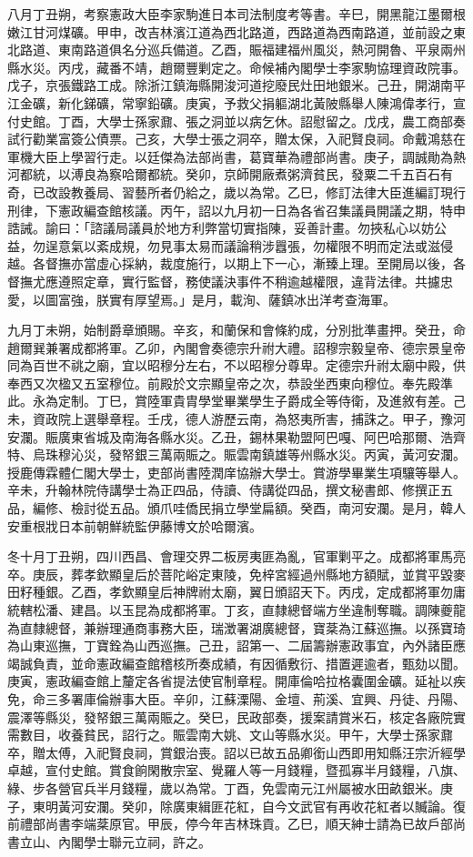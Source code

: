 \begin{pinyinscope}
八月丁丑朔，考察憲政大臣李家駒進日本司法制度考等書。辛巳，開黑龍江墨爾根嫩江甘河煤礦。甲申，改吉林濱江道為西北路道，西路道為西南路道，並前設之東北路道、東南路道俱名分巡兵備道。乙酉，賑福建福州風災，熱河開魯、平泉兩州縣水災。丙戌，藏番不靖，趙爾豐剿定之。命候補內閣學士李家駒協理資政院事。戊子，京張鐵路工成。除浙江鎮海縣開浚河道挖廢民灶田地銀米。己丑，開湖南平江金礦，新化銻礦，常寧鉛礦。庚寅，予救父捐軀湖北黃陂縣舉人陳鴻偉孝行，宣付史館。丁酉，大學士孫家鼐、張之洞並以病乞休。詔慰留之。戊戌，農工商部奏試行勸業富簽公債票。己亥，大學士張之洞卒，贈太保，入祀賢良祠。命戴鴻慈在軍機大臣上學習行走。以廷傑為法部尚書，葛寶華為禮部尚書。庚子，調誠勛為熱河都統，以溥良為察哈爾都統。癸卯，京師開廠煮粥濟貧民，發粟二千五百石有奇，已改設教養局、習藝所者仍給之，歲以為常。乙巳，修訂法律大臣進編訂現行刑律，下憲政編查館核議。丙午，詔以九月初一日為各省召集議員開議之期，特申誥誡。諭曰：「諮議局議員於地方利弊當切實指陳，妥善計畫。勿挾私心以妨公益，勿逞意氣以紊成規，勿見事太易而議論稍涉囂張，勿權限不明而定法或滋侵越。各督撫亦當虛心採納，裁度施行，以期上下一心，漸臻上理。至開局以後，各督撫尤應遵照定章，實行監督，務使議決事件不稍逾越權限，違背法律。共攄忠愛，以圖富強，朕實有厚望焉。」是月，載洵、薩鎮冰出洋考查海軍。

九月丁未朔，始制爵章頒賜。辛亥，和蘭保和會條約成，分別批準畫押。癸丑，命趙爾巽兼署成都將軍。乙卯，內閣會奏德宗升祔大禮。詔穆宗毅皇帝、德宗景皇帝同為百世不祧之廟，宜以昭穆分左右，不以昭穆分尊卑。定德宗升祔太廟中殿，供奉西又次楹又五室穆位。前殿於文宗顯皇帝之次，恭設坐西東向穆位。奉先殿準此。永為定制。丁巳，賞陸軍貴胄學堂畢業學生子爵成全等侍衛，及進敘有差。己未，資政院上選舉章程。壬戌，德人游歷云南，為怒夷所害，捕誅之。甲子，豫河安瀾。賑廣東省城及南海各縣水災。乙丑，錫林果勒盟阿巴嘎、阿巴哈那爾、浩齊特、烏珠穆沁災，發帑銀三萬兩賑之。賑雲南鎮雄等州縣水災。丙寅，黃河安瀾。授鹿傳霖體仁閣大學士，吏部尚書陸潤庠協辦大學士。賞游學畢業生項驤等舉人。辛未，升翰林院侍講學士為正四品，侍讀、侍講從四品，撰文秘書郎、修撰正五品，編修、檢討從五品。頒爪哇僑民捐立學堂扁額。癸酉，南河安瀾。是月，韓人安重根戕日本前朝鮮統監伊藤博文於哈爾濱。

冬十月丁丑朔，四川西昌、會理交界二板房夷匪為亂，官軍剿平之。成都將軍馬亮卒。庚辰，葬孝欽顯皇后於菩陀峪定東陵，免梓宮經過州縣地方額賦，並賞平毀麥田籽種銀。乙酉，孝欽顯皇后神牌祔太廟，翼日頒詔天下。丙戌，定成都將軍勿庸統轄松潘、建昌。以玉昆為成都將軍。丁亥，直隸總督端方坐違制奪職。調陳夔龍為直隸總督，兼辦理通商事務大臣，瑞澂署湖廣總督，寶棻為江蘇巡撫。以孫寶琦為山東巡撫，丁寶銓為山西巡撫。己丑，詔第一、二屆籌辦憲政事宜，內外諸臣應竭誠負責，並命憲政編查館稽核所奏成績，有因循敷衍、措置遲逾者，甄劾以聞。庚寅，憲政編查館上釐定各省提法使官制章程。開庫倫哈拉格囊圍金礦。延祉以疾免，命三多署庫倫辦事大臣。辛卯，江蘇溧陽、金壇、荊溪、宜興、丹徒、丹陽、震澤等縣災，發帑銀三萬兩賑之。癸巳，民政部奏，援案請賞米石，核定各廠院實需數目，收養貧民，詔行之。賑雲南大姚、文山等縣水災。甲午，大學士孫家鼐卒，贈太傅，入祀賢良祠，賞銀治喪。詔以已故五品卿銜山西即用知縣汪宗沂經學卓越，宣付史館。賞食餉閑散宗室、覺羅人等一月錢糧，暨孤寡半月錢糧，八旗、綠、步各營官兵半月錢糧，歲以為常。丁酉，免雲南元江州屬被水田畝銀米。庚子，東明黃河安瀾。癸卯，除廣東緝匪花紅，自今文武官有再收花紅者以贓論。復前禮部尚書李端棻原官。甲辰，停今年吉林珠貢。乙巳，順天紳士請為已故戶部尚書立山、內閣學士聯元立祠，許之。


\end{pinyinscope}
